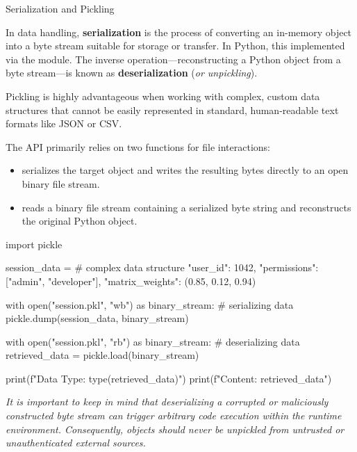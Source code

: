 \documentclass[10pt]{article}
\begin{document}
    \begin{core}[label=core:pickling]{Serialization and Pickling}

      In data handling, \textbf{serialization} is the process of converting an in-memory object into a byte stream suitable for storage or transfer. In Python, this implemented via the  module. The inverse operation---reconstructing a Python object from a byte stream---is known as \textbf{deserialization} (\textit{or unpickling}).

      Pickling is highly advantageous when working with complex, custom data structures that cannot be easily represented in standard, human-readable text formats like JSON or CSV.

      The  API primarily relies on two functions for file interactions:

      \begin{itemize}

          \item {} serializes the target object and writes the resulting bytes directly to an open binary file stream.

          \item {} reads a binary file stream containing a serialized byte string and reconstructs the original Python object.

      \end{itemize}

      \begin{pyconsole}

        import pickle

        session_data = { # complex data structure
            "user_id": 1042,
            "permissions": ["admin", "developer"],
            "matrix_weights": (0.85, 0.12, 0.94)
        }

        with open("session.pkl", "wb") as binary_stream: # serializing data
            pickle.dump(session_data, binary_stream)

        with open("session.pkl", "rb") as binary_stream: # deserializing data
            retrieved_data = pickle.load(binary_stream)

        print(f"Data Type: {type(retrieved_data)}")
        print(f"Content: {retrieved_data}")

      \end{pyconsole}

      \textit{It is important to keep in mind that deserializing a corrupted or maliciously constructed byte stream can trigger arbitrary code execution within the runtime environment. Consequently, objects should never be unpickled from untrusted or unauthenticated external sources.}

    \end{core}
\end{document}
